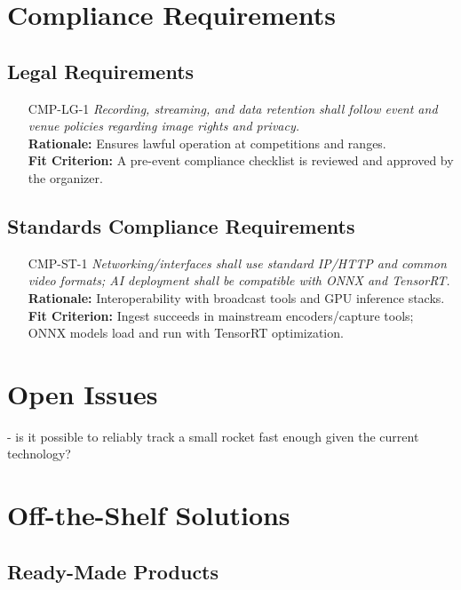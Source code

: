\documentclass[12pt]{article}
\begin{document}
\section{Compliance Requirements}
\subsection{Legal Requirements}
\begin{itemize}[leftmargin=*]
  \item[CMP-LG-1] \emph{Recording, streaming, and data retention shall follow event and
          venue policies regarding image rights and privacy.}\\ \textbf{Rationale:}
        Ensures lawful operation at competitions and ranges.\\ \textbf{Fit Criterion:}
        A pre-event compliance checklist is reviewed and approved by the organizer.
\end{itemize}

\subsection{Standards Compliance Requirements}
\begin{itemize}[leftmargin=*]
  \item[CMP-ST-1] \emph{Networking/interfaces shall use standard IP/HTTP and common
          video formats; AI deployment shall be compatible with ONNX and TensorRT.}\\
        \textbf{Rationale:} Interoperability with broadcast tools and GPU inference
        stacks.\\ \textbf{Fit Criterion:} Ingest succeeds in mainstream
        encoders/capture tools; ONNX models load and run with TensorRT optimization.
\end{itemize}

\section{Open Issues}

- is it possible to reliably track a small rocket fast enough given the current technology?

\section{Off-the-Shelf Solutions}
\subsection{Ready-Made Products}
\end{document}

